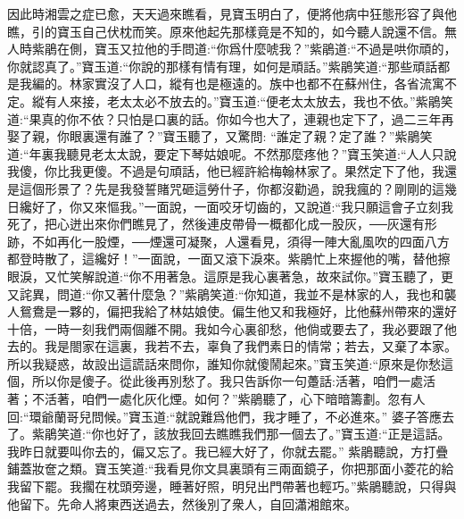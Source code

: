 \begin{parag}
    因此時湘雲之症已愈，天天過來瞧看，見寶玉明白了，便將他病中狂態形容了與他瞧，引的寶玉自己伏枕而笑。原來他起先那樣竟是不知的，如今聽人說還不信。無人時紫鵑在側，寶玉又拉他的手問道:“你爲什麼唬我？”紫鵑道:“不過是哄你頑的，你就認真了。”寶玉道:“你說的那樣有情有理，如何是頑話。”紫鵑笑道:“那些頑話都是我編的。林家實沒了人口，縱有也是極遠的。族中也都不在蘇州住，各省流寓不定。縱有人來接，老太太必不放去的。”寶玉道:“便老太太放去，我也不依。”紫鵑笑道:“果真的你不依？只怕是口裏的話。你如今也大了，連親也定下了，過二三年再娶了親，你眼裏還有誰了？”寶玉聽了，又驚問: “誰定了親？定了誰？”紫鵑笑道:“年裏我聽見老太太說，要定下琴姑娘呢。不然那麼疼他？”寶玉笑道:“人人只說我傻，你比我更傻。不過是句頑話，他已經許給梅翰林家了。果然定下了他，我還是這個形景了？先是我發誓賭咒砸這勞什子，你都沒勸過，說我瘋的？剛剛的這幾日纔好了，你又來慪我。”一面說，一面咬牙切齒的，又說道:“我只願這會子立刻我死了，把心迸出來你們瞧見了，然後連皮帶骨一概都化成一股灰，──灰還有形跡，不如再化一股煙，──煙還可凝聚，人還看見，須得一陣大亂風吹的四面八方都登時散了，這纔好！”一面說，一面又滾下淚來。紫鵑忙上來握他的嘴，替他擦眼淚，又忙笑解說道:“你不用著急。這原是我心裏著急，故來試你。”寶玉聽了，更又詫異，問道:“你又著什麼急？”紫鵑笑道:“你知道，我並不是林家的人，我也和襲人鴛鴦是一夥的，偏把我給了林姑娘使。偏生他又和我極好，比他蘇州帶來的還好十倍，一時一刻我們兩個離不開。我如今心裏卻愁，他倘或要去了，我必要跟了他去的。我是閤家在這裏，我若不去，辜負了我們素日的情常；若去，又棄了本家。所以我疑惑，故設出這謊話來問你，誰知你就傻鬧起來。”寶玉笑道:“原來是你愁這個，所以你是傻子。從此後再別愁了。我只告訴你一句躉話:活著，咱們一處活著；不活著，咱們一處化灰化煙。如何？”紫鵑聽了，心下暗暗籌劃。忽有人回:“環爺蘭哥兒問候。”寶玉道:“就說難爲他們，我才睡了，不必進來。” 婆子答應去了。紫鵑笑道:“你也好了，該放我回去瞧瞧我們那一個去了。”寶玉道:“正是這話。我昨日就要叫你去的，偏又忘了。我已經大好了，你就去罷。” 紫鵑聽說，方打疊鋪蓋妝奩之類。寶玉笑道:“我看見你文具裏頭有三兩面鏡子，你把那面小菱花的給我留下罷。我擱在枕頭旁邊，睡著好照，明兒出門帶著也輕巧。”紫鵑聽說，只得與他留下。先命人將東西送過去，然後別了衆人，自回瀟湘館來。
\end{parag}


